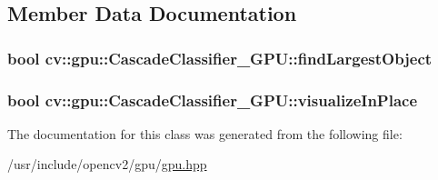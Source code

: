\subsection{Member Data Documentation}
\hypertarget{classcv_1_1gpu_1_1CascadeClassifier__GPU_ae2278404d7669cd4e98598791d6aac2d}{
\subsubsection[{find\-Largest\-Object}]{\setlength{\rightskip}{0pt plus 5cm}bool cv\-::gpu\-::\-Cascade\-Classifier\-\_\-\-G\-P\-U\-::find\-Largest\-Object}}\label{classcv_1_1gpu_1_1CascadeClassifier__GPU_ae2278404d7669cd4e98598791d6aac2d}
\hypertarget{classcv_1_1gpu_1_1CascadeClassifier__GPU_a46c3e4aacca43b5abe7fb048cb08c8f7}{
\subsubsection[{visualize\-In\-Place}]{\setlength{\rightskip}{0pt plus 5cm}bool cv\-::gpu\-::\-Cascade\-Classifier\-\_\-\-G\-P\-U\-::visualize\-In\-Place}}\label{classcv_1_1gpu_1_1CascadeClassifier__GPU_a46c3e4aacca43b5abe7fb048cb08c8f7}


The documentation for this class was generated from the following file\-:\begin{DoxyCompactItemize}
\item 
/usr/include/opencv2/gpu/\hyperlink{gpu_2gpu_8hpp}{gpu.\-hpp}\end{DoxyCompactItemize}
